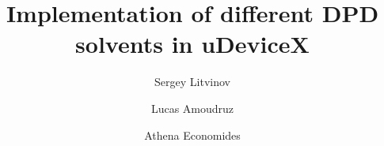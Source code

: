\author{Sergey Litvinov \and Lucas Amoudruz \and Athena Economides}
\title{Implementation of different DPD solvents in uDeviceX}
\date{}

